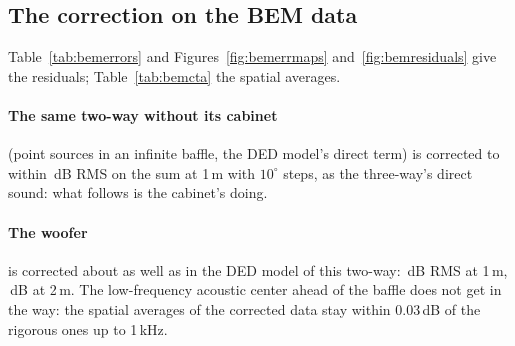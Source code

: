 \documentclass[11pt,a4paper]{article}
\begin{document}
\subsection{The correction on the BEM data}
\label{sec:bemcorr}

Table~\ref{tab:bemerrors} and Figures~\ref{fig:bemerrmaps} and~\ref{fig:bemresiduals} give the
residuals; Table~\ref{tab:bemcta} the spatial averages.

\paragraph{The same two-way without its cabinet} (point sources in an infinite baffle, the DED model's
direct term) is corrected to within \ptsSysCorOne\,dB RMS on the sum at 1\,m with $10^\circ$ steps, as the
three-way's direct sound: what follows is the cabinet's doing.

\paragraph{The woofer} is corrected about as well as in the DED model of this two-way: \bemWfCorOne\,dB
RMS at 1\,m, \bemWfCorTwo\,dB at 2\,m. The low-frequency acoustic center ahead of the baffle does not get
in the way: the spatial averages of the corrected data stay within 0.03\,dB of the rigorous ones up to
1\,kHz.
\end{document}
